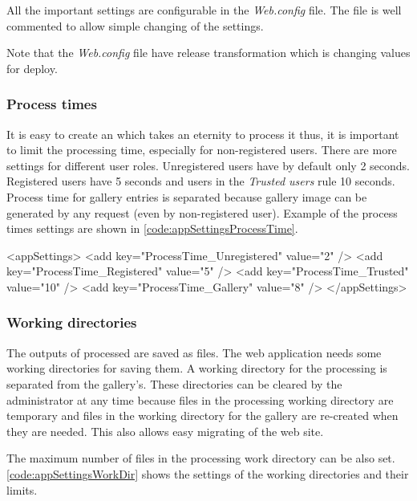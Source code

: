 All the important settings are configurable in the \emph{Web.config} file.
The file is well commented to allow simple changing of the settings.

Note that the \emph{Web.config} file have release transformation which is changing values for deploy.


\subsubsection{Process times}

It is easy to create an \lsystem which takes an eternity to process it thus, it is important to limit the processing time, especially for non-registered users.
There are more settings for different user roles.
Unregistered users have by default only 2 seconds.
Registered users have 5 seconds and users in the \emph{Trusted users} rule 10 seconds.
Process time for gallery entries is separated because gallery image can be generated by any request (even by non-registered user).
Example of the process times settings are shown in \autoref{code:appSettingsProcessTime}.

\begin{XML}[label=code:appSettingsProcessTime,caption={Process time settings in the \emph{Web.config}}]
<appSettings>
	<add key="ProcessTime_Unregistered" value="2" />
	<add key="ProcessTime_Registered" value="5" />
	<add key="ProcessTime_Trusted" value="10" />
	<add key="ProcessTime_Gallery" value="8" />
</appSettings>
\end{XML}


\subsubsection{Working directories}
\label{sec:configWorkDir}

The outputs of processed \lsystems are saved as files.
The web application needs some working directories for saving them.
A working directory for the \lsystem processing is separated from the gallery's.
These directories can be cleared by the administrator at any time because files in the processing working directory are temporary and files in the working directory  for the gallery are re-created when they are needed.
This also allows easy migrating of the web site.

The maximum number of files in the processing work directory can be also set.
\autoref{code:appSettingsWorkDir} shows the settings of the working directories and their limits.

